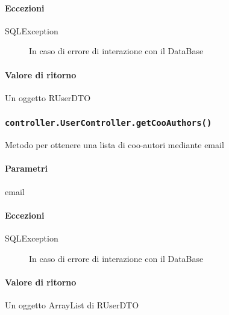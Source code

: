 \paragraph{Eccezioni}
\begin{description}
\item[SQLException] In caso di errore di interazione con il DataBase
\end{description}
\paragraph{Valore di ritorno}
Un oggetto RUserDTO

\subsubsection{\texttt{controller.UserController.getCooAuthors()}}
Metodo per ottenere una lista di coo-autori mediante email
\paragraph{Parametri}
\begin{description}
\item email
\end{description}
\paragraph{Eccezioni}
\begin{description}
\item[SQLException] In caso di errore di interazione con il DataBase
\end{description}
\paragraph{Valore di ritorno}
Un oggetto ArrayList di RUserDTO


